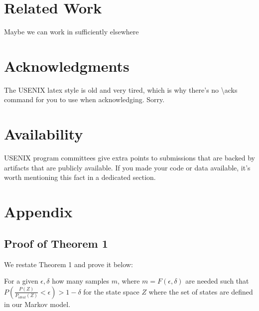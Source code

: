 \section*{Related Work}

Maybe we can work in sufficiently elsewhere 

\section*{Acknowledgments}

The USENIX latex style is old and very tired, which is why
there's no \textbackslash{}acks command for you to use when
acknowledging. Sorry.

\section*{Availability}

USENIX program committees give extra points to submissions that are
backed by artifacts that are publicly available. If you made your code
or data available, it's worth mentioning this fact in a dedicated
section.

\section*{Appendix}
\subsection{Proof of Theorem 1}
We restate Theorem 1 and prove it below:

\begin{theorem}
\label{mainThm}
For a given $\epsilon, \delta$ how many samples $m$, where $m = F(\epsilon, \delta)$ are needed such that $P(\frac{P(Z)}{P_{ideal}(Z)}< \epsilon) > 1 - \delta$ for the state space $Z$ where the set of states are defined in our Markov model. 
\end{theorem}


